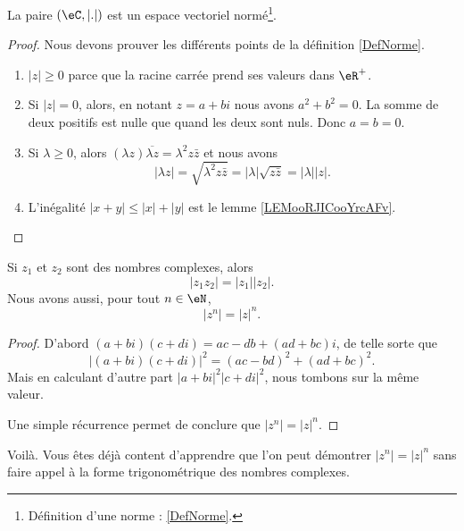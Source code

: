 \begin{proposition}
	La paire \( (\eC, | . |)\) est un espace vectoriel normé\footnote{Définition d'une norme : \ref{DefNorme}.}.
\end{proposition}

\begin{proof}
	Nous devons prouver les différents points de la définition \ref{DefNorme}.
	\begin{enumerate}
		\item
		      \( | z |\geq 0\) parce que la racine carrée prend ses valeurs dans \( \eR^+\).
		\item
		      Si \( | z |=0\), alors, en notant \( z=a+bi\) nous avons \( a^2+b^2=0\). La somme de deux positifs est nulle que quand les deux sont nuls. Donc \( a=b=0\).
		\item
		      Si \( \lambda\geq 0\), alors \( (\lambda z)\overline{ \lambda z }=\lambda^2z\bar z\) et nous avons
		      \begin{equation}
			      | \lambda z |=\sqrt{ \lambda^2z\bar z }=| \lambda |\sqrt{ z\bar z }=| \lambda | |z |.
		      \end{equation}
		\item
		      L'inégalité \( | x+y |\leq | x |+| y |\) est le lemme \ref{LEMooRJICooYrcAFv}.
	\end{enumerate}
\end{proof}


\begin{proposition} \label{PROPooXLARooYSDCsF}
	Si \( z_1\) et \( z_2\) sont des nombres complexes, alors
	\begin{equation}
		| z_1z_2 |=| z_1 | |z_2 |.
	\end{equation}
	Nous avons aussi, pour tout \( n\in \eN\),
	\begin{equation}       \label{EQooATTQooRpJeCo}
		| z^n |=| z |^n.
	\end{equation}
\end{proposition}

\begin{proof}
	D'abord \( (a+bi)(c+di)=ac-db+(ad+bc)i\), de telle sorte que
	\begin{equation}
		| (a+bi)(c+di) |^2=(ac-bd)^2+(ad+bc)^2.
	\end{equation}
	Mais en calculant d'autre part \( | a+bi |^2| c+di |^2\), nous tombons sur la même valeur.

	Une simple récurrence permet de conclure que \( | z^n |=| z |^n\).
\end{proof}
Voilà. Vous êtes déjà content d'apprendre que l'on peut démontrer \( | z^n |=| z |^n\) sans faire appel à la forme trigonométrique des nombres complexes.

